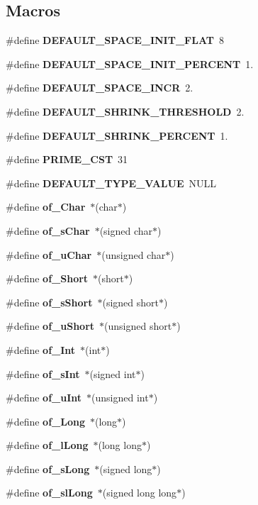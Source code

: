 \subsection*{Macros}
\begin{DoxyCompactItemize}
\item 
\#define {\bf D\+E\+F\+A\+U\+L\+T\+\_\+\+S\+P\+A\+C\+E\+\_\+\+I\+N\+I\+T\+\_\+\+F\+L\+AT}~8
\item 
\#define {\bf D\+E\+F\+A\+U\+L\+T\+\_\+\+S\+P\+A\+C\+E\+\_\+\+I\+N\+I\+T\+\_\+\+P\+E\+R\+C\+E\+NT}~1.
\item 
\#define {\bf D\+E\+F\+A\+U\+L\+T\+\_\+\+S\+P\+A\+C\+E\+\_\+\+I\+N\+CR}~2.
\item 
\#define {\bf D\+E\+F\+A\+U\+L\+T\+\_\+\+S\+H\+R\+I\+N\+K\+\_\+\+T\+H\+R\+E\+S\+H\+O\+LD}~2.
\item 
\#define {\bf D\+E\+F\+A\+U\+L\+T\+\_\+\+S\+H\+R\+I\+N\+K\+\_\+\+P\+E\+R\+C\+E\+NT}~1.
\item 
\#define {\bfseries P\+R\+I\+M\+E\+\_\+\+C\+ST}~31
\item 
\#define {\bfseries D\+E\+F\+A\+U\+L\+T\+\_\+\+T\+Y\+P\+E\+\_\+\+V\+A\+L\+UE}~N\+U\+LL
\item 
\#define {\bfseries of\+\_\+\+Char}~$\ast$(char$\ast$)
\item 
\#define {\bfseries of\+\_\+s\+Char}~$\ast$(signed char$\ast$)
\item 
\#define {\bfseries of\+\_\+u\+Char}~$\ast$(unsigned char$\ast$)
\item 
\#define {\bfseries of\+\_\+\+Short}~$\ast$(short$\ast$)
\item 
\#define {\bfseries of\+\_\+s\+Short}~$\ast$(signed short$\ast$)
\item 
\#define {\bfseries of\+\_\+u\+Short}~$\ast$(unsigned short$\ast$)
\item 
\#define {\bfseries of\+\_\+\+Int}~$\ast$(int$\ast$)
\item 
\#define {\bfseries of\+\_\+s\+Int}~$\ast$(signed int$\ast$)
\item 
\#define {\bfseries of\+\_\+u\+Int}~$\ast$(unsigned int$\ast$)
\item 
\#define {\bfseries of\+\_\+\+Long}~$\ast$(long$\ast$)
\item 
\#define {\bfseries of\+\_\+l\+Long}~$\ast$(long long$\ast$)
\item 
\#define {\bfseries of\+\_\+s\+Long}~$\ast$(signed long$\ast$)
\item 
\#define {\bfseries of\+\_\+sl\+Long}~$\ast$(signed long long$\ast$)
\item 

\end{DoxyCompactItemize}
